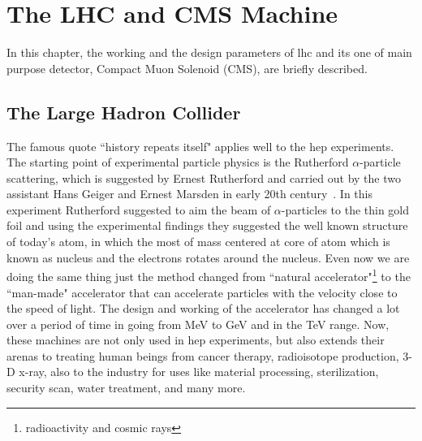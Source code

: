 \chapter{The LHC and CMS Machine} %
\label{cha:the_lhc_and_cms_machine}

In this chapter, the working and the design parameters of \acrfull{lhc} and its one of main purpose detector, Compact Muon Solenoid (CMS), are briefly described.


\section{The Large Hadron Collider} %
\label{sec:the_large_hadron_collider}

The famous quote ``history repeats itself" applies well to the \acrfull{hep} experiments. The starting point of experimental particle physics is the Rutherford $\alpha$-particle scattering, which is suggested by Ernest Rutherford and carried out by the two assistant  Hans Geiger and Ernest Marsden in early 20th century~\cite{Hauptman2010}. In this experiment Rutherford suggested to aim the beam of $\alpha$-particles to the thin gold foil and using the experimental findings they suggested the well known structure of today's atom, in which the most of mass centered at core of atom which is known as nucleus and the electrons  rotates around the nucleus. Even now we are doing the same thing just the method changed from ``natural accelerator"\footnote{radioactivity and cosmic rays} to the ``man-made" accelerator that can accelerate particles with the velocity close to the speed of light. The design and working of the accelerator has changed a lot over a period of time in going from MeV to GeV and in the TeV range. Now, these machines are not only used in \acrshort{hep} experiments, but also extends their arenas to treating human beings from cancer therapy, radioisotope production, 3-D x-ray, also to the industry for uses like material processing, sterilization, security scan, water treatment, and many more. 

